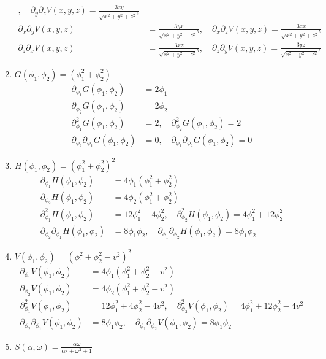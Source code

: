 \documentclass[11pt,answers]{exam}
\begin{document}
\begin{questions}
\begin{solution}
\begin{enumerate}
\begin{align*}
	,\quad
	\partial_y\partial_zV(x,y,z)=\frac{3zy}{\sqrt{x^2+y^2+z^2}^5}
	\\
	\partial_x\partial_yV(x,y,z)&=\frac{3yx}{\sqrt{x^2+y^2+z^2}^5}
	,\quad
	\partial_x\partial_zV(x,y,z)=\frac{3zx}{\sqrt{x^2+y^2+z^2}^5}
	\\
	\partial_z\partial_xV(x,y,z)&=\frac{3xz}{\sqrt{x^2+y^2+z^2}^5}
	,\quad
	\partial_z\partial_yV(x,y,z)=\frac{3yz}{\sqrt{x^2+y^2+z^2}^5}
\end{align*}
\item $G(\phi_1,\phi_2)=(\phi_1^2+\phi_2^2)$
\begin{align*}
	\partial_{\phi_1}G(\phi_1,\phi_2)&=2\phi_1
	\\
	\partial_{\phi_2}G(\phi_1,\phi_2)&=2\phi_2
	\\
	\partial_{\phi_1}^2G(\phi_1,\phi_2)&=2
	,\quad
	\partial_{\phi_2}^2G(\phi_1,\phi_2)=2
	\\
	\partial_{\phi_2}\partial_{\phi_1}G(\phi_1,\phi_2)&=0
	,\quad
	\partial_{\phi_1}\partial_{\phi_2}G(\phi_1,\phi_2)=0
\end{align*}
\item $H(\phi_1,\phi_2)=(\phi_1^2+\phi_2^2)^2$
\begin{align*}
	\partial_{\phi_1}H(\phi_1,\phi_2)&=4\phi_1(\phi_1^2+\phi_2^2)
	\\
	\partial_{\phi_2}H(\phi_1,\phi_2)&=4\phi_2(\phi_1^2+\phi_2^2)
	\\
	\partial_{\phi_1}^2H(\phi_1,\phi_2)&=12\phi_1^2+4\phi_2^2
	,\quad
	\partial_{\phi_2}^2H(\phi_1,\phi_2)=4\phi_1^2+12\phi_2^2
	\\
	\partial_{\phi_2}\partial_{\phi_1}H(\phi_1,\phi_2)&=8\phi_1\phi_2
	,\quad
	\partial_{\phi_1}\partial_{\phi_2}H(\phi_1,\phi_2)=8\phi_1\phi_2
\end{align*}
\item $V(\phi_1,\phi_2)=\left(\phi_1^2+\phi_2^2-v^2\right)^2$
\begin{align*}
	\partial_{\phi_1}V(\phi_1,\phi_2)&=4\phi_1(\phi_1^2+\phi_2^2-v^2)
	\\
	\partial_{\phi_2}V(\phi_1,\phi_2)&=4\phi_2(\phi_1^2+\phi_2^2-v^2)
	\\
	\partial_{\phi_1}^2V(\phi_1,\phi_2)&=12\phi_1^2+4\phi_2^2-4v^2
	,\quad
	\partial_{\phi_2}^2V(\phi_1,\phi_2)=4\phi_1^2+12\phi_2^2-4v^2
	\\
	\partial_{\phi_2}\partial_{\phi_1}V(\phi_1,\phi_2)&=8\phi_1\phi_2
	,\quad
	\partial_{\phi_1}\partial_{\phi_2}V(\phi_1,\phi_2)=8\phi_1\phi_2
\end{align*}
\item $S(\alpha,\omega)=\frac{\alpha\omega}{\alpha^2+\omega^2+1}$

\end{enumerate}
\end{solution}
\end{questions}
\end{document}
